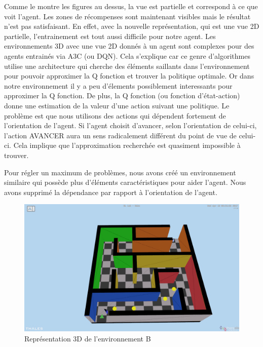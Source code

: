 Comme le montre les figures au dessus, la vue est partielle et correspond à ce que voit l'agent. Les zones de récompenses sont maintenant visibles mais le résultat n'est pas satisfaisant. En effet, avec la nouvelle représentation, qui est une vue 2D partielle, l'entrainement est tout aussi difficile pour notre agent. Les environnements 3D avec une vue 2D donnés à un agent sont complexes pour des agents entrainés via A3C (ou DQN). Cela s'explique car ce genre d'algorithmes utilise une architecture qui cherche des éléments saillants dans l'environnement pour pouvoir approximer la Q fonction et trouver la politique optimale. Or dans notre environnement il y a peu d'élements possiblement interessants pour approximer la Q fonction. De plus, la Q fonction (ou fonction d'état-action) donne une estimation de la valeur d'une action suivant une politique. Le problème est que nous utilisons des actions qui dépendent fortement de l'orientation de l'agent. Si l'agent choisit d'avancer, selon l'orientation de celui-ci, l'action AVANCER aura un sens radicalement différent du point de vue de celui-ci. Cela implique que l'approximation recherchée est quasiment impossible à trouver.

Pour régler un maximum de problèmes, nous avons créé  un environnement similaire qui possède plus d'éléments caractéristiques  pour aider l'agent. Nous avons supprimé la dépendance par rapport à l'orientation de l'agent. 


\begin{figure}[h!]
    \begin{center}
        \includegraphics[scale=.15]{./assets/SESTAR/env_sestar_color.png}
\caption{Représentation 3D de l'environnement B}
\end{center}
\end{figure}

